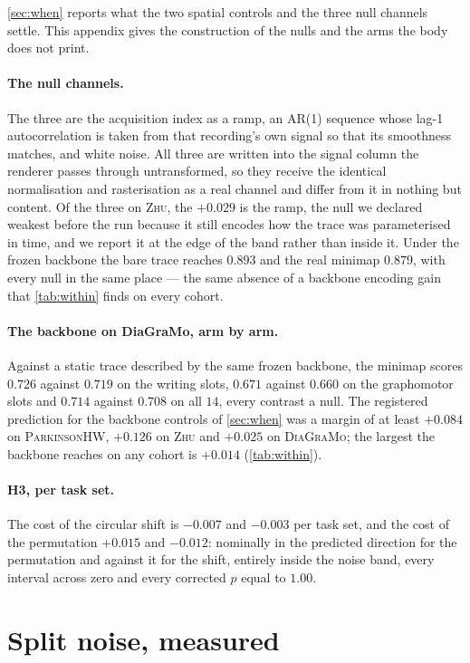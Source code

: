 \documentclass[10pt,a4paper]{article}
\begin{document}
\cref{sec:when} reports what the two spatial controls and the three null channels settle. This
appendix gives the construction of the nulls and the arms the body does not print.

\paragraph{The null channels.} The three are the acquisition index as a ramp, an AR(1) sequence
whose lag-1 autocorrelation is taken from that recording's own signal so that its smoothness
matches, and white noise. All three are written into the signal column the renderer passes through
untransformed, so they receive the identical normalisation and rasterisation as a real channel and
differ from it in nothing but content. Of the three on \textsc{Zhu}, the $+0.029$ is the ramp, the
null we declared weakest before the run because it still encodes how the trace was parameterised in
time, and we report it at the edge of the band rather than inside it. Under the frozen backbone the
bare trace reaches $0.893$ and the real minimap $0.879$, with every null in the same place --- the
same absence of a backbone encoding gain that \cref{tab:within} finds on every cohort.

\paragraph{The backbone on DiaGraMo, arm by arm.} Against a static trace described by the same
frozen backbone, the minimap scores $0.726$ against $0.719$ on the writing slots, $0.671$ against
$0.660$ on the graphomotor slots and $0.714$ against $0.708$ on all $14$, every contrast a null.
The registered prediction for the backbone controls of \cref{sec:when} was a margin of at least
$+0.084$ on \textsc{ParkinsonHW}, $+0.126$ on \textsc{Zhu} and $+0.025$ on \textsc{DiaGraMo}; the
largest the backbone reaches on any cohort is $+0.014$ (\cref{tab:within}).

\paragraph{H3, per task set.} The cost of the circular shift is $-0.007$ and $-0.003$ per task set,
and the cost of the permutation $+0.015$ and $-0.012$: nominally in the predicted direction for the
permutation and against it for the shift, entirely inside the noise band, every interval across zero
and every corrected $p$ equal to $1.00$.

\section{Split noise, measured}
\label{sec:splitnoise-appendix}
\end{document}
